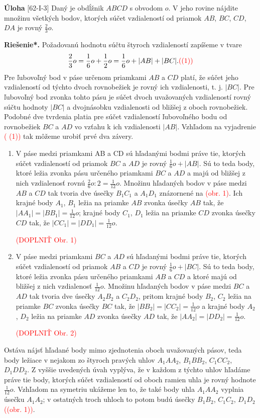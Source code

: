 \documentclass{article}
\newcommand{\rieh}{\textbf{Riešenie*.} }
\newcommand\todo[1]{\noindent\textcolor{red}{(#1)}}
\newcommand{\problem}[3]{
  \begin{tcolorbox}[breakable,notitle,boxrule=0pt,colback=light-gray,colframe=light-gray]
    \textbf{Úloha}
    [#1] #2
  \end{tcolorbox}
  \noindent#3
}
\begin{document}
\problem{62-I-3}{
Daný je obdĺžnik $ABCD$ s obvodom $o$. V jeho rovine nájdite množinu všetkých bodov, ktorých súčet vzdialeností od priamok $AB$, $BC$, $CD$, $DA$ je rovný $\frac{2}{3}o$. 
}{
\rieh Požadovanú hodnotu súčtu štyroch vzdialeností zapíšeme v tvare
$$ \frac{2}{3}o = \frac{1}{6}o +\frac{1}{2}o =\frac{1}{6}o + |AB| + |BC|. \todo{(1)}$$
Pre ľubovoľný bod v páse určenom priamkami $AB$ a $CD$ platí, že súčet jeho vzdialeností od týchto dvoch rovnobežiek je rovný ich vzdialenosti, t. j. $|BC|$. Pre ľubovoľný bod zvonka tohto pásu je súčet dvoch uvažovaných vzdialeností rovný súčtu hodnoty $|BC|$ a dvojnásobku vzdialenosti od bližšej z oboch rovnobežiek. Podobné dve tvrdenia platia pre súčet vzdialeností ľubovoľného bodu od rovnobežiek $BC$ a $AD$ vo vzťahu k ich vzdialenosti $|AB|$. Vzhľadom na vyjadrenie \todo{ (1)} tak môžeme urobiť prvé dva závery.

\begin{enumerate}[(1)]
    \item  V páse medzi priamkami AB a CD sú hľadanými bodmi práve tie, ktorých súčet vzdialeností od priamok $BC$ a $AD$ je rovný $\frac{1}{6}o + |AB|$. Sú to teda body, ktoré ležia zvonka pásu určeného priamkami $BC$ a $AD$ a majú od bližšej z nich vzdialenosť rovnú $\frac{2}{6}o : 2 = \frac{1}{12}o$. Množinu hľadaných bodov v páse medzi $AB$ a $CD$ tak tvoria dve úsečky $B_1 C_1$ a $A_1 D_1$ znázornené na \todo{obr. 1}. Ich krajné body $A_1$, $B_1$ ležia na priamke $AB$ zvonka úsečky $AB$ tak, že $|AA_1 | = |BB_1 | =\frac{1}{12}o$; krajné body $C_1$, $D_1$ ležia na priamke $CD$ zvonka úsečky $CD$ tak, že $|CC_1 | = |DD_1 | = \frac{1}{12}o$.
    
    \todo{DOPLNIŤ Obr. 1}
    
    \item V páse medzi priamkami $BC$ a $AD$ sú hľadanými bodmi práve tie, ktorých súčet vzdialeností od priamok $AB$ a $CD$ je rovný $\frac{1}{6}o + |BC|$. Sú to teda body, ktoré ležia zvonka pásu určeného priamkami $AB$ a $CD$ a ktoré majú od bližšej z nich vzdialenosť $\frac{1}{12}o$. Množinu hľadaných bodov v páse medzi $BC$ a $AD$ tak tvoria dve úsečky $A_2 B_2$ a $C_2 D_2$, pritom krajné body $B_2$, $C_2$ ležia na priamke $BC$ zvonka úsečky $BC$ tak, že $|BB_2 | = |CC_2 | =\frac{1}{12}o$ a krajné body $A_2$, $D_2$ ležia na priamke $AD$ zvonka úsečky $AD$ tak, že $|AA_2 | = |DD_2 | =\frac{1}{12}o$. 
    
    \todo{DOPLNIŤ Obr. 2}

\end{enumerate}
Ostáva nájsť hľadané body mimo zjednotenia oboch uvažovaných pásov, teda body ležiace v nejakom zo štyroch
pravých uhlov $A_1 AA_2$, $B_1 BB_2$, $C_1 CC_2$, $D_1 DD_2$. Z vyššie uvedených úvah vyplýva, že v každom z týchto uhlov hľadáme práve tie body, ktorých súčet vzdialeností od oboch ramien uhla je rovný hodnote $\frac{1}{12}o$. Vzhľadom na symetriu ukážeme len to, že také body uhla $A_1 AA_2$ vyplnia úsečku $A_1 A_2$; v ostatných troch uhloch to potom budú úsečky $B_1 B_2$, $C_1 C_2$, $D_1 D_2$ \todo{(obr. 1)}.

}
\end{document}
